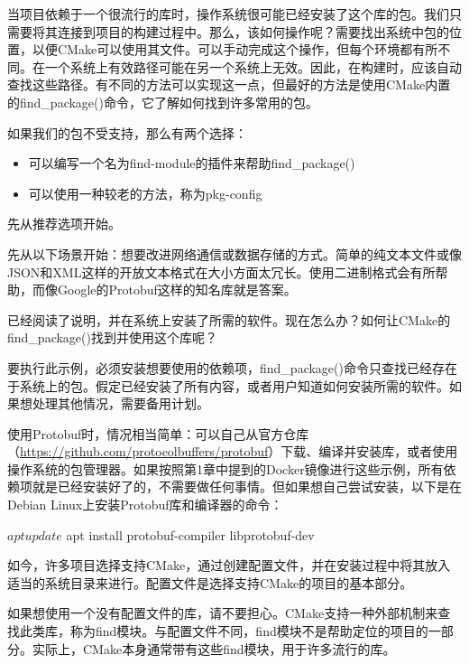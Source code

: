 
当项目依赖于一个很流行的库时，操作系统很可能已经安装了这个库的包。我们只需要将其连接到项目的构建过程中。那么，该如何操作呢？需要找出系统中包的位置，以便CMake可以使用其文件。可以手动完成这个操作，但每个环境都有所不同。在一个系统上有效路径可能在另一个系统上无效。因此，在构建时，应该自动查找这些路径。有不同的方法可以实现这一点，但最好的方法是使用CMake内置的find\_package()命令，它了解如何找到许多常用的包。

如果我们的包不受支持，那么有两个选择：

\begin{itemize}
\item
可以编写一个名为find-module的插件来帮助find\_package()

\item
可以使用一种较老的方法，称为pkg-config
\end{itemize}

先从推荐选项开始。


先从以下场景开始：想要改进网络通信或数据存储的方式。简单的纯文本文件或像JSON和XML这样的开放文本格式在大小方面太冗长。使用二进制格式会有所帮助，而像Google的Protobuf这样的知名库就是答案。

已经阅读了说明，并在系统上安装了所需的软件。现在怎么办？如何让CMake的find\_package()找到并使用这个库呢？

要执行此示例，必须安装想要使用的依赖项，find\_package()命令只查找已经存在于系统上的包。假定已经安装了所有内容，或者用户知道如何安装所需的软件。如果想处理其他情况，需要备用计划。

使用Protobuf时，情况相当简单：可以自己从官方仓库（\url{https://github.com/protocolbuffers/protobuf}）下载、编译并安装库，或者使用操作系统的包管理器。如果按照第1章中提到的Docker镜像进行这些示例，所有依赖项就是已经安装好了的，不需要做任何事情。但如果想自己尝试安装，以下是在Debian Linux上安装Protobuf库和编译器的命令：

\begin{shell}
$ apt update
$ apt install protobuf-compiler libprotobuf-dev
\end{shell}

如今，许多项目选择支持CMake，通过创建配置文件，并在安装过程中将其放入适当的系统目录来进行。配置文件是选择支持CMake的项目的基本部分。

如果想使用一个没有配置文件的库，请不要担心。CMake支持一种外部机制来查找此类库，称为find模块。与配置文件不同，find模块不是帮助定位的项目的一部分。实际上，CMake本身通常带有这些find模块，用于许多流行的库。

